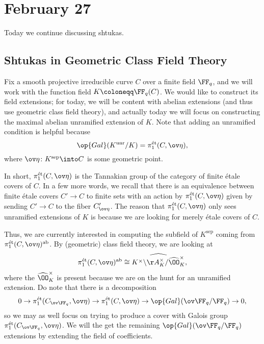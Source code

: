 \documentclass[../notes.tex]{subfiles}
\begin{document}
\section{February 27}
Today we continue discussing shtukas.

\subsection{Shtukas in Geometric Class Field Theory}
Fix a smooth projective irreducible curve $C$ over a finite field $\FF_q$, and we will work with the function field $K\coloneqq\FF_q(C)$. We would like to construct its field extensions; for today, we will be content with abelian extensions (and thus use geometric class field theory), and actually today we will focus on constructing the maximal abelian unramified extension of $K$. Note that adding an unramified condition is helpful because
\[\op{Gal}(K^{\mathrm{unr}}/K)=\pi_1^{\mathrm{\acute et}}(C,\ov\eta),\]
where $\ov\eta\colon K^{\mathrm{sep}}\into C$ is some geometric point.
\begin{remark}
	In short, $\pi_1^{\mathrm{\acute et}}(C,\ov\eta)$ is the Tannakian group of the category of finite \'etale covers of $C$. In a few more words, we recall that there is an equivalence between finite \'etale covers $C'\to C$ to finite sets with an action by $\pi_1^{\mathrm{\acute et}}(C,\ov\eta)$ given by sending $C'\to C$ to the fiber $C'_{\ov\eta}$. The reason that $\pi_1^{\mathrm{\acute et}}(C,\ov\eta)$ only sees unramified extensions of $K$ is because we are looking for merely \'etale covers of $C$.
\end{remark}
Thus, we are currently interested in computing the subfield of $K^{\mathrm{sep}}$ coming from $\pi_1^{\mathrm{\acute et}}(C,\ov\eta)^{\mathrm{ab}}$. By (geometric) class field theory, we are looking at
\[\pi_1^{\mathrm{\acute et}}(C,\ov\eta)^{\mathrm{ab}}\cong \widehat{K^\times\backslash\AA_K^\times/\widehat\OO_K^\times},\]
where the $\widehat\OO_K^\times$ is present because we are on the hunt for an unramified extension. Do note that there is a decomposition
\[0\to\pi_1^{\mathrm{\acute et}}(C_{\ov\FF_q},\ov\eta)\to\pi_1^{\mathrm{\acute et}}(C,\ov\eta)\to\op{Gal}(\ov\FF_q/\FF_q)\to0,\]
so we may as well focus on trying to produce a cover with Galois group $\pi_1^{\mathrm{\acute et}}(C_{\ov\FF_q},\ov\eta)$. We will the get the remaining $\op{Gal}(\ov\FF_q/\FF_q)$ extensions by extending the field of coefficients.
\end{document}
